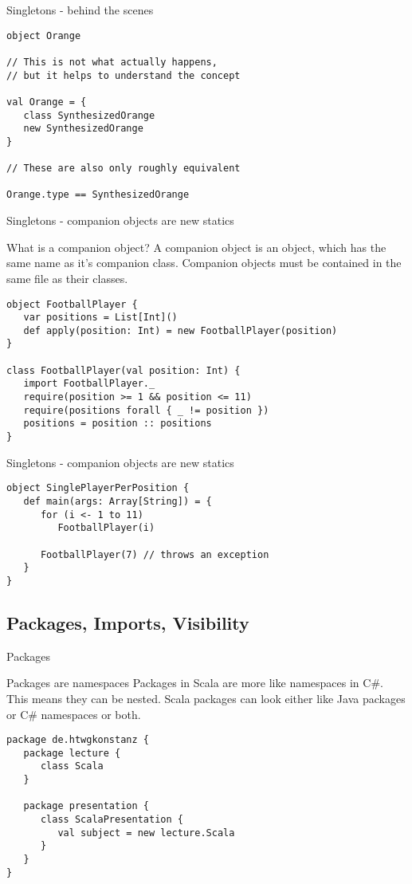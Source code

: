 \begin{frame}[fragile]{Singletons - behind the scenes}
\begin{lstlisting}
object Orange

// This is not what actually happens,
// but it helps to understand the concept

val Orange = {
   class SynthesizedOrange
   new SynthesizedOrange
}

// These are also only roughly equivalent

Orange.type == SynthesizedOrange
\end{lstlisting}

\end{frame}

\begin{frame}[fragile]{Singletons - companion objects are new statics}
\begin{block}{What is a companion object?}
A companion object is an object, which has the same name as it's companion
class. Companion objects \alert{must} be contained in the same file as their
classes.
\end{block}
\pause
\begin{lstlisting}
object FootballPlayer {
   var positions = List[Int]()
   def apply(position: Int) = new FootballPlayer(position)
}

class FootballPlayer(val position: Int) {
   import FootballPlayer._
   require(position >= 1 && position <= 11)
   require(positions forall { _ != position })
   positions = position :: positions
}
\end{lstlisting}
\end{frame}

\begin{frame}[fragile]{Singletons - companion objects are new statics}
\begin{lstlisting}
object SinglePlayerPerPosition {
   def main(args: Array[String]) = {
      for (i <- 1 to 11)
         FootballPlayer(i)

      FootballPlayer(7) // throws an exception
   }
}
\end{lstlisting}
\end{frame}

\subsection{Packages, Imports, Visibility}

\begin{frame}[fragile]{Packages}
\begin{block}{Packages are namespaces}
Packages in Scala are more like namespaces in C\#. This means they can be
nested. Scala packages can look either like Java packages or C\# namespaces or
both.
\end{block}
\pause
\begin{lstlisting}
package de.htwgkonstanz {
   package lecture {
      class Scala
   }
   
   package presentation {
      class ScalaPresentation {
         val subject = new lecture.Scala
      }
   }
}
\end{lstlisting}
\end{frame}

